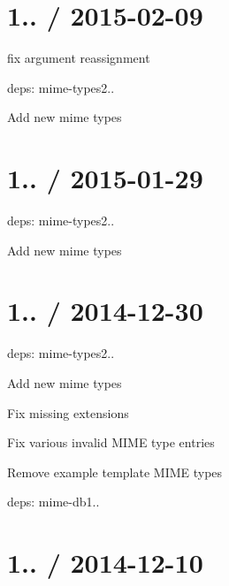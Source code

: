 \section*{1.. / 2015-\/02-\/09 }


\begin{DoxyItemize}
\item fix argument reassignment
\item deps\+: mime-\/types2..
\begin{DoxyItemize}
\item Add new mime types
\end{DoxyItemize}
\end{DoxyItemize}

\section*{1.. / 2015-\/01-\/29 }


\begin{DoxyItemize}
\item deps\+: mime-\/types2..
\begin{DoxyItemize}
\item Add new mime types
\end{DoxyItemize}
\end{DoxyItemize}

\section*{1.. / 2014-\/12-\/30 }


\begin{DoxyItemize}
\item deps\+: mime-\/types2..
\begin{DoxyItemize}
\item Add new mime types
\item Fix missing extensions
\item Fix various invalid M\+I\+ME type entries
\item Remove example template M\+I\+ME types
\item deps\+: mime-\/db1..
\end{DoxyItemize}
\end{DoxyItemize}

\section*{1.. / 2014-\/12-\/10 }


